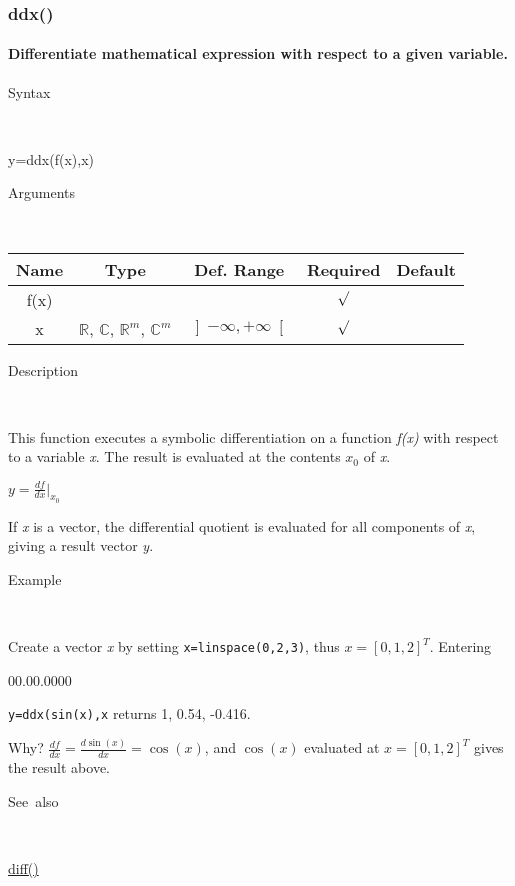 \subsubsection*{\hypertarget{ddx}{}{\Large ddx()}}


\paragraph{\label{par:Differentiate-Symbolicly}Differentiate mathematical expression with respect to a given variable.}

\begin{description}
\item [Syntax]~
\end{description}
y=ddx(f(x),x)

\begin{description}
\item [Arguments]~
\end{description}
\begin{tabular}{|c|c|c|c|c|}
\hline 
Name&
Type&
Def. Range&
Required&
Default\tabularnewline
\hline
\hline 
f(x)&
&
&
$\surd$&
\tabularnewline
\hline 
x&
$\mathbb{R}$, $\mathbb{C}$, $\mathbb{R}^{m}$, $\mathbb{C}^{m}$&
$\left]-\infty,+\infty\right[$&
$\surd$&
\tabularnewline
\hline 
\end{tabular}

\begin{description}
\item [Description]~
\end{description}
This function executes a symbolic differentiation on a function \textit{f(x)} with respect to a variable \textit{x}.
The result is evaluated at the contents $x_0$ of \textit{x}.

\medskip{}
${\displaystyle y=\frac{df}{dx} \Bigg|_{x_0}}$
\medskip{}

If \textit{x} is a vector, the differential quotient is evaluated for all components of \textit{x}, giving a result vector \textit{y}.

\begin{description}
\item [Example]~
\end{description}
Create a vector \textit{x} by setting \texttt{x=linspace(0,2,3)}, thus $x=\left[0,1,2\right]^T$. Entering
\begin{lyxlist}{00.00.0000}
\item [\texttt{y=ddx(sin(x),x}]returns 1, 0.54, -0.416.
\end{lyxlist}
Why? ${\displaystyle \frac{df}{dx}=\frac{d \sin(x)}{dx}=\cos(x)}$, and $\cos(x)$ evaluated at $x=\left[0,1,2\right]^T$
gives the result above.
\begin{description}
\item [See~also]~
\end{description}
\textcolor{blue}{\hyperlink{diff}{diff()}}

